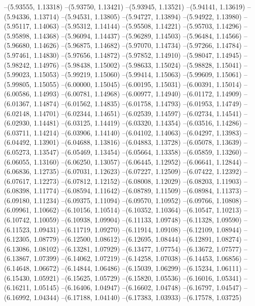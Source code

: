 --(5.93555, 1.13318)
--(5.93750, 1.13421)
--(5.93945, 1.13521)
--(5.94141, 1.13619)
--(5.94336, 1.13714)
--(5.94531, 1.13805)
--(5.94727, 1.13894)
--(5.94922, 1.13980)
--(5.95117, 1.14063)
--(5.95312, 1.14144)
--(5.95508, 1.14221)
--(5.95703, 1.14296)
--(5.95898, 1.14368)
--(5.96094, 1.14437)
--(5.96289, 1.14503)
--(5.96484, 1.14566)
--(5.96680, 1.14626)
--(5.96875, 1.14682)
--(5.97070, 1.14734)
--(5.97266, 1.14784)
--(5.97461, 1.14830)
--(5.97656, 1.14872)
--(5.97852, 1.14910)
--(5.98047, 1.14945)
--(5.98242, 1.14976)
--(5.98438, 1.15002)
--(5.98633, 1.15024)
--(5.98828, 1.15041)
--(5.99023, 1.15053)
--(5.99219, 1.15060)
--(5.99414, 1.15063)
--(5.99609, 1.15061)
--(5.99805, 1.15055)
--(6.00000, 1.15045)
--(6.00195, 1.15031)
--(6.00391, 1.15014)
--(6.00586, 1.14993)
--(6.00781, 1.14968)
--(6.00977, 1.14940)
--(6.01172, 1.14909)
--(6.01367, 1.14874)
--(6.01562, 1.14835)
--(6.01758, 1.14793)
--(6.01953, 1.14749)
--(6.02148, 1.14701)
--(6.02344, 1.14651)
--(6.02539, 1.14597)
--(6.02734, 1.14541)
--(6.02930, 1.14481)
--(6.03125, 1.14419)
--(6.03320, 1.14354)
--(6.03516, 1.14286)
--(6.03711, 1.14214)
--(6.03906, 1.14140)
--(6.04102, 1.14063)
--(6.04297, 1.13983)
--(6.04492, 1.13901)
--(6.04688, 1.13816)
--(6.04883, 1.13728)
--(6.05078, 1.13639)
--(6.05273, 1.13547)
--(6.05469, 1.13454)
--(6.05664, 1.13358)
--(6.05859, 1.13260)
--(6.06055, 1.13160)
--(6.06250, 1.13057)
--(6.06445, 1.12952)
--(6.06641, 1.12844)
--(6.06836, 1.12735)
--(6.07031, 1.12623)
--(6.07227, 1.12509)
--(6.07422, 1.12392)
--(6.07617, 1.12273)
--(6.07812, 1.12152)
--(6.08008, 1.12029)
--(6.08203, 1.11903)
--(6.08398, 1.11774)
--(6.08594, 1.11642)
--(6.08789, 1.11509)
--(6.08984, 1.11373)
--(6.09180, 1.11234)
--(6.09375, 1.11094)
--(6.09570, 1.10952)
--(6.09766, 1.10808)
--(6.09961, 1.10662)
--(6.10156, 1.10514)
--(6.10352, 1.10364)
--(6.10547, 1.10213)
--(6.10742, 1.10059)
--(6.10938, 1.09904)
--(6.11133, 1.09748)
--(6.11328, 1.09590)
--(6.11523, 1.09431)
--(6.11719, 1.09270)
--(6.11914, 1.09108)
--(6.12109, 1.08944)
--(6.12305, 1.08779)
--(6.12500, 1.08612)
--(6.12695, 1.08444)
--(6.12891, 1.08274)
--(6.13086, 1.08102)
--(6.13281, 1.07929)
--(6.13477, 1.07754)
--(6.13672, 1.07577)
--(6.13867, 1.07399)
--(6.14062, 1.07219)
--(6.14258, 1.07038)
--(6.14453, 1.06856)
--(6.14648, 1.06672)
--(6.14844, 1.06486)
--(6.15039, 1.06299)
--(6.15234, 1.06111)
--(6.15430, 1.05921)
--(6.15625, 1.05729)
--(6.15820, 1.05536)
--(6.16016, 1.05341)
--(6.16211, 1.05145)
--(6.16406, 1.04947)
--(6.16602, 1.04748)
--(6.16797, 1.04547)
--(6.16992, 1.04344)
--(6.17188, 1.04140)
--(6.17383, 1.03933)
--(6.17578, 1.03725)
